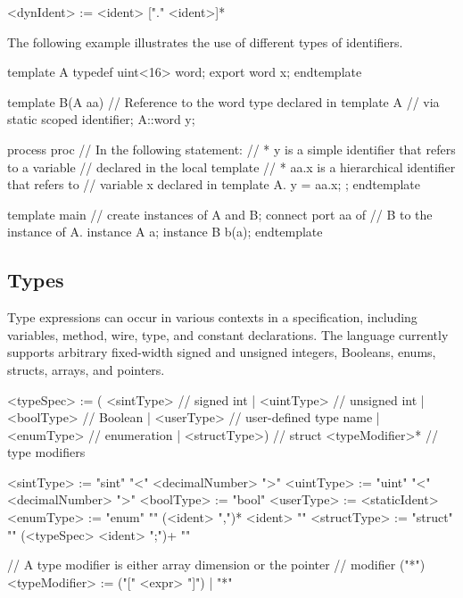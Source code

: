 \begin{bnflisting}
<dynIdent> := <ident> ["." <ident>]*
\end{bnflisting}

The following example illustrates the use of different types of 
identifiers.

\begin{tsllisting2}
template A
  typedef uint<16> word;
  export word x;
endtemplate
    
template B(A aa)
  // Reference to the word type declared in template A
  // via static scoped identifier;
  A::word y;

  process proc {
    // In the following statement:
    // * y is a simple identifier that refers to a variable
    //   declared in the local template
    // * aa.x is a hierarchical identifier that refers to
    //   variable x declared in template A.
    y = aa.x;
  };
endtemplate

template main
  // create instances of A and B; connect port aa of
  // B to the instance of A.
  instance A a;
  instance B b(a);
endtemplate
\end{tsllisting2}


\subsection{Types}

Type expressions can occur in various contexts in a \tsl 
specification, including variables, method, wire, type, and 
constant declarations.  The language currently supports arbitrary 
fixed-width signed and unsigned integers, Booleans, enums, 
structs, arrays, and pointers.

\begin{bnflisting}
<typeSpec>   := ( <sintType>    // signed int
                | <uintType>    // unsigned int
                | <boolType>    // Boolean
                | <userType>    // user-defined type name
                | <enumType>    // enumeration
                | <structType>) // struct
                <typeModifier>* // type modifiers

<sintType>   := "sint" "<" <decimalNumber> ">"
<uintType>   := "uint" "<" <decimalNumber> ">"
<boolType>   := "bool"
<userType>   := <staticIdent>
<enumType>   := "enum" "{" (<ident> ",")*  <ident> "}"
<structType> := "struct" "{" (<typeSpec> <ident> ";")+ "}"

// A type modifier is either array dimension or the pointer
// modifier ("*")
<typeModifier> := ("[" <expr> "]")
                | "*"
\end{bnflisting}

